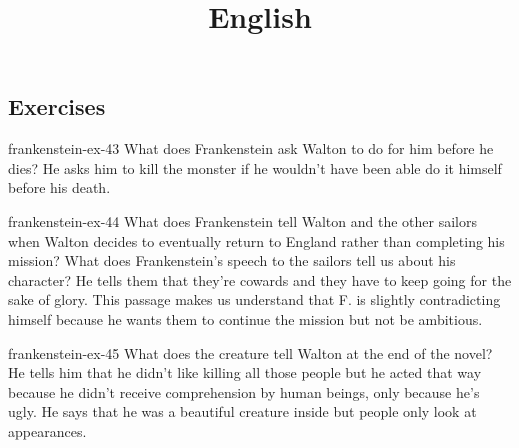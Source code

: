 \documentclass[preview]{standalone}
\begin{document}
\title{English}
\genpage


\subsection{Exercises}

\begin{snippetexercise}{frankenstein-ex-43}
    {What does Frankenstein ask Walton to do for him before he dies?}
    He asks him to kill the monster if he wouldn't have been able 
    do it himself before his death. 
\end{snippetexercise}

\begin{snippetexercise}{frankenstein-ex-44}
    {What does Frankenstein tell Walton and the other sailors when Walton decides to eventually
    return to England rather than completing his mission? What does Frankenstein's speech to the
    sailors tell us about his character?}
    He tells them that they're cowards and they have to keep going for the sake
    of glory. This passage makes us understand that F. is slightly contradicting himself
    because he wants them to continue the mission but not be ambitious.
\end{snippetexercise}

\begin{snippetexercise}{frankenstein-ex-45}
    {What does the creature tell Walton at the end of the novel?}
    He tells him that he didn't like killing all those people but he acted that
    way because he didn't receive comprehension by human beings, only because
    he's ugly. He says that he was a beautiful creature inside but people only look
    at appearances.
\end{snippetexercise}
\end{document}
